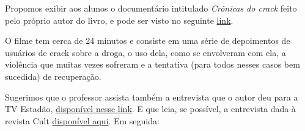 \documentclass[12pt]{extarticle}
\begin{document}
		Propomos exibir aos alunos o documentário
		intitulado \emph{Crônicas do crack} feito pelo próprio
		autor do livro, e pode ser visto no seguinte
		\href{https://www.youtube.com/watch?v=47NIEsOO6qA}{link}.


		O filme tem cerca de 24 minutos e consiste em uma série de depoimentos
		de usuários de crack sobre
		a droga, o uso dela, como se envolveram com ela, 
		a violência que muitas vezes sofreram e a
		tentativa (para todos nesses casos bem sucedida) de recuperação.

		Sugerimos que o professor assista também a entrevista que o autor
		deu para a TV Estadão, \href{https://www.facebook.com/209792265728043/videos/1772581939449060}{disponível nesse link}. E que leia, se possível, a entrevista dada à revista Cult \href{https://rotacult.com.br/2017/08/dr-luis-marra-fala-sobre-o-livro-cronicas-do-crack/}{disponível aqui}. Em seguida:
\end{document}
